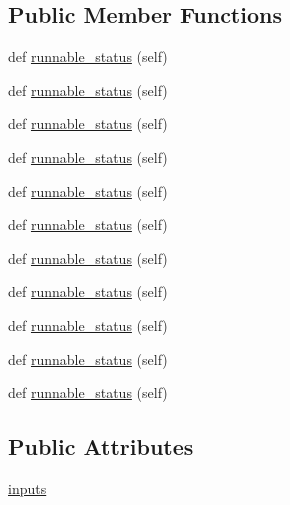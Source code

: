 \subsection*{Public Member Functions}
\begin{DoxyCompactItemize}
\item 
def \hyperlink{classwaflib_1_1_tools_1_1javaw_1_1jar__create_ada4d893d42b31db71153d1be63ba3404}{runnable\+\_\+status} (self)
\item 
def \hyperlink{classwaflib_1_1_tools_1_1javaw_1_1jar__create_ada4d893d42b31db71153d1be63ba3404}{runnable\+\_\+status} (self)
\item 
def \hyperlink{classwaflib_1_1_tools_1_1javaw_1_1jar__create_ada4d893d42b31db71153d1be63ba3404}{runnable\+\_\+status} (self)
\item 
def \hyperlink{classwaflib_1_1_tools_1_1javaw_1_1jar__create_ada4d893d42b31db71153d1be63ba3404}{runnable\+\_\+status} (self)
\item 
def \hyperlink{classwaflib_1_1_tools_1_1javaw_1_1jar__create_ada4d893d42b31db71153d1be63ba3404}{runnable\+\_\+status} (self)
\item 
def \hyperlink{classwaflib_1_1_tools_1_1javaw_1_1jar__create_ada4d893d42b31db71153d1be63ba3404}{runnable\+\_\+status} (self)
\item 
def \hyperlink{classwaflib_1_1_tools_1_1javaw_1_1jar__create_ada4d893d42b31db71153d1be63ba3404}{runnable\+\_\+status} (self)
\item 
def \hyperlink{classwaflib_1_1_tools_1_1javaw_1_1jar__create_ada4d893d42b31db71153d1be63ba3404}{runnable\+\_\+status} (self)
\item 
def \hyperlink{classwaflib_1_1_tools_1_1javaw_1_1jar__create_ada4d893d42b31db71153d1be63ba3404}{runnable\+\_\+status} (self)
\item 
def \hyperlink{classwaflib_1_1_tools_1_1javaw_1_1jar__create_ada4d893d42b31db71153d1be63ba3404}{runnable\+\_\+status} (self)
\item 
def \hyperlink{classwaflib_1_1_tools_1_1javaw_1_1jar__create_ada4d893d42b31db71153d1be63ba3404}{runnable\+\_\+status} (self)
\end{DoxyCompactItemize}
\subsection*{Public Attributes}
\begin{DoxyCompactItemize}
\item 
\hyperlink{classwaflib_1_1_tools_1_1javaw_1_1jar__create_a6c9c26c19e7e97ce1e051ded91d5a523}{inputs}
\end{DoxyCompactItemize}
